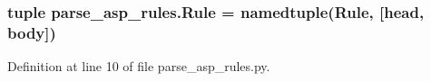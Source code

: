 \hypertarget{namespaceparse__asp__rules_a14e0f083d2fb02ac073930c7d32fc056}{}
\subsubsection[{Rule}]{\setlength{\rightskip}{0pt plus 5cm}tuple parse\+\_\+asp\+\_\+rules.\+Rule = namedtuple(\textquotesingle{}Rule\textquotesingle{}, \mbox{[}\textquotesingle{}head\textquotesingle{}, \textquotesingle{}body\textquotesingle{}\mbox{]})}\label{namespaceparse__asp__rules_a14e0f083d2fb02ac073930c7d32fc056}


Definition at line 10 of file parse\+\_\+asp\+\_\+rules.\+py.

